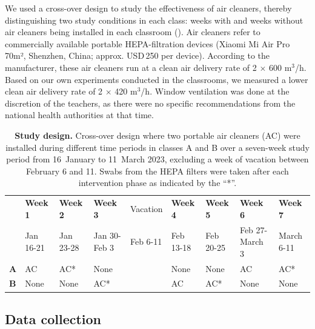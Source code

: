 \documentclass[fleqn,11pt]{wlscirep}
\begin{document}
\noindent We used a cross-over design to study the effectiveness of air cleaners, thereby distinguishing two study conditions in each class: weeks with and weeks without air cleaners being installed in each classroom (). Air cleaners refer to commercially available portable HEPA-filtration devices (Xiaomi Mi Air Pro 70m², Shenzhen, China; approx. USD\,250 per device). According to the manufacturer, these air cleaners run at a clean air delivery rate of 2$\,\times\,$600 m$^{3}$/h. Based on our own experiments conducted in the classrooms, we measured a lower clean air delivery rate of 2$\,\times\,$420 m$^{3}$/h. Window ventilation was done at the discretion of the teachers, as there were no specific recommendations from the national health authorities at that time.

\begin{table}[!htpb]
    \footnotesize
    \centering
    \caption{\textbf{Study design.} Cross-over design where two portable air cleaners (AC) were installed during different time periods in classes A and B over a seven-week study period from 16~January to 11~March 2023, excluding a week of vacation between February 6 and 11. Swabs from the HEPA filters were taken after each intervention phase as indicated by the ``*''.}\label{tab:study_design}
    \begin{tabular}{l l l l l l l l l}
    \toprule
      & \textbf{Week 1} & \textbf{Week 2} & \textbf{Week 3} & Vacation & \textbf{Week 4} & \textbf{Week 5} & \textbf{Week 6} & \textbf{Week 7} \\
      & Jan 16-21 & Jan 23-28 & Jan 30-Feb 3 & Feb 6-11 & Feb 13-18 & Feb 20-25 & Feb 27-March 3 & March 6-11 \\
      \midrule
      \textbf{A} & \cellcolor{gray!50} AC & \cellcolor{gray!50} AC\hphantom{0000}*& \cellcolor{gray!10} None & & \cellcolor{gray!10} None & \cellcolor{gray!10} None & \cellcolor{gray!50} AC & \cellcolor{gray!50} AC\hphantom{00009}* \\
      \textbf{B} & \cellcolor{gray!10} None & \cellcolor{gray!10} None & \cellcolor{gray!50} AC\hphantom{0000000}* & & \cellcolor{gray!50} AC & \cellcolor{gray!50} AC\hphantom{0000}*& \cellcolor{gray!10} None & \cellcolor{gray!10} None \\
      \bottomrule
    \end{tabular}
\end{table}
 
\subsection{Data collection}
\end{document}
